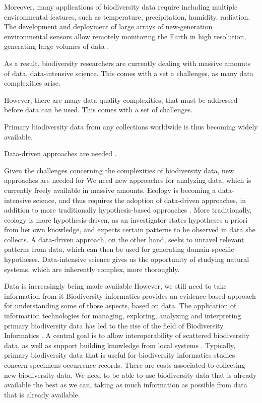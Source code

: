 Moreover, many applications of biodiversity data require including multiple environmental features, such as temperature, precipitation, humidity, radiation.
The development and deployment of large arrays of new-generation environmental sensors allow remotely monitoring the Earth in high resolution, generating large volumes of data \cite{Lehning2009}.


As a result, biodiversity researchers are currently dealing with massive amounts of data, data-intensive science.
This comes with a set a challenges, as many data complexities arise.




However, there are many data-quality complexities, that must be addressed before data can be used.
This comes with a set of challenges.

Primary biodiversity data from any collections worldwide is thus becoming widely available.

Data-driven approaches are needed \cite{kelling2009}.

Given the challenges concerning the complexities of biodiversity data, new approaches are needed for
We need new approaches for analyzing data, which is currently freely available in massive amounts.
Ecology is becoming a data-intensive science, and thus requires the adoption of data-driven approaches, in addition to more traditionally hypothesis-based approaches \cite{Kelling2009}.
More traditionally, ecology is more hypothesis-driven, as an investigator states hypotheses a priori from her own knowledge, and expects certain patterns to be observed in data she collects.
A data-driven approach, on the other hand, seeks to unravel relevant patterns from data, which can then be used for generating domain-specific hypotheses.
Data-intensive science gives us the opportunity of studying natural systems, which are inherently complex, more thoroughly.




Data is increasingly being made available
However, we still need to take information from it
Biodiversity informatics provides an evidence-based approach for understanding some of those aspects, based on data.
The application of information technologies for managing, exploring, analyzing and interpreting primary biodiversity data has led to the rise of the field of Biodiversity Informatics \cite{Soberon2004}.
A central goal is to allow interoperability of scattered biodiversity data, as well as support building knowledge from local systems \cite{Bisby200}.
Typically, primary biodiversity data that is useful for biodiversity informatics studies concern specimens occurrence records.
There are costs associated to collecting new biodiversity data.
We need to be able to use biodiversity data that is already available the best as we can, taking as much information as possible from data that is already available.

